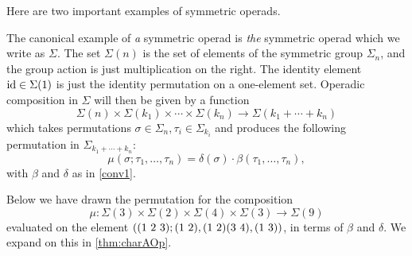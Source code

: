 Here are two important examples of symmetric operads.

\begin{example}\label{ex:Sigma}
The canonical example of \emph{a} symmetric operad is \emph{the} symmetric operad which we write as $\Sigma$. The set $\Sigma(n)$ is the set of elements of the symmetric group $\Sigma_{n}$, and the group action is just multiplication on the right. The identity element $\textrm{id} \in \Sigma(1)$ is just the identity permutation on a one-element set. Operadic composition in $\Sigma$ will then be given by a function
  \[
    \Sigma(n) \times \Sigma(k_{1}) \times \cdots \times \Sigma(k_{n}) \rightarrow \Sigma(k_{1} + \cdots + k_{n})
  \]
which takes permutations $\sigma \in \Sigma_{n}, \tau_{i} \in \Sigma_{k_{i}}$ and produces the following permutation in $\Sigma_{k_{1} + \cdots + k_{n}}$:
  \[
    \mu(\sigma; \tau_{1}, \ldots, \tau_{n}) = \delta(\sigma) \cdot \beta(\tau_1,\ldots,\tau_n),
  \]
with $\beta$ and $\delta$ as in \cref{conv1}.

Below we have drawn the permutation for the composition
  \[
    \mu \colon \Sigma(3) \times \Sigma(2) \times \Sigma(4) \times \Sigma(3) \rightarrow \Sigma(9)
  \]
evaluated on the element $\left( (1 \,\, 2 \,\, 3); ( 1 \, \, 2 ),( 1 \, \, 2 )( 3 \, \, 4 ),( 1 \, \, 3 ) \right)$, in terms of $\beta$ and $\delta$. We expand on this in \cref{thm:charAOp}.
  \begin{center}
  \end{center}
  

\end{example}
